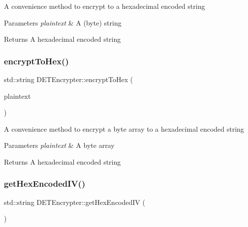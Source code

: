 A convenience method to encrypt to a hexadecimal encoded string 
\begin{DoxyParams}{Parameters}
{\em plaintext} & A (byte) string \\
\hline
\end{DoxyParams}
\begin{DoxyReturn}{Returns}
A hexadecimal encoded string 
\end{DoxyReturn}
\mbox{\label{classDETEncrypter_a78128a4a9df72a4199abbd06f6169c48}} 
\subsubsection{\texorpdfstring{encrypt\+To\+Hex()}{encryptToHex()}\hspace{0.1cm}{\footnotesize\ttfamily [2/2]}}
{\footnotesize\ttfamily std\+::string D\+E\+T\+Encrypter\+::encrypt\+To\+Hex (\begin{DoxyParamCaption}\item[{Crypto\+P\+P\+::\+Sec\+Byte\+Block \&}]{plaintext }\end{DoxyParamCaption})}

A convenience method to encrypt a byte array to a hexadecimal encoded string 
\begin{DoxyParams}{Parameters}
{\em plaintext} & A byte array \\
\hline
\end{DoxyParams}
\begin{DoxyReturn}{Returns}
A hexadecimal encoded string 
\end{DoxyReturn}
\mbox{\label{classDETEncrypter_adebcf0d8c18e5b994a8f6cc3e29edff6}} 
\subsubsection{\texorpdfstring{get\+Hex\+Encoded\+I\+V()}{getHexEncodedIV()}}
{\footnotesize\ttfamily std\+::string D\+E\+T\+Encrypter\+::get\+Hex\+Encoded\+IV (\begin{DoxyParamCaption}{ }\end{DoxyParamCaption})}

